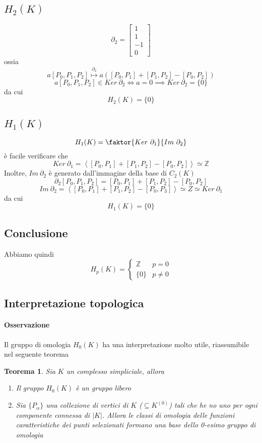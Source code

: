 \documentclass[a4paper]{report}
\newtheorem{theorem}{Teorema}
\newcommand{\Z}{\ensuremath{\mathbb{Z}}}
\newcommand{\gen}[1]{\ensuremath{\left<{#1}\right>}}
\newcommand{\pskel}[2]{\ensuremath{{#1}^{({#2})}}}
\begin{document}
\subsection{$H_2(K)$}
\[
    \partial_2=\begin{bmatrix}
        1 \\1\\-1\\0
    \end{bmatrix}
\]
ossia
\[
    a[P_0,P_1,P_2]\overset{\partial_2}{\longmapsto}a([P_0,P_1]+[P_1,P_2]-[P_0,P_2])
\]
\[
    a[P_0,P_1,P_2]\in Ker\ \partial_2\Longleftrightarrow a=0\implies Ker\ \partial_2=\{0\}
\]
da cui
\[
    H_2(K)=\{0\}
\]
\subsection{$H_1(K)$}
\[
    H_1(K)=\faktor{Ker\ \partial_1}{Im\ \partial_2}
\]
è facile verificare che
\[
    Ker\ \partial_1=\gen{[P_0,P_1]+[P_1,P_2]-[P_0,P_2]}\simeq\Z
\]
Inoltre, $Im\ \partial_2$ è generato dall'immagine della base di $C_2(K)$
\[
    \partial_2[P_0,P_1,P_2]=[P_0,P_1]+[P_1,P_2]-[P_0,P_2]
\]
\[
    Im\ \partial_2=\gen{[P_0,P_1]+[P_1,P_2]-[P_0,P_3]}\simeq Z\simeq Ker\ \partial_1
\]
da cui
\[
    H_1(K)=\{0\}
\]
\subsection{Conclusione}
Abbiamo quindi
\[
    H_p(K)=\left\{
    \begin{array}{ll}
        \Z    & p=0     \\
        \{0\} & p\neq 0
    \end{array}
    \right.
\]
\subsection{Interpretazione topologica}
\paragraph{Osservazione} Il gruppo di omologia $H_0(K)$ ha una interpretazione molto utile, riassumibile nel seguente teorema
\begin{theorem}
    Sia $K$ un complesso simpliciale, allora
    \begin{enumerate}
        \item Il gruppo $H_0(K)$ è un gruppo libero
        \item Sia $\{P_\alpha\}$ una collezione di vertici di $K$ ($\subseteq\pskel{K}{0}$) tali che he no uno per ogni componente connessa di $|K|$. Allora le classi di omologia delle funzioni caratteristiche dei punti selezionati formano una base dello 0-esimo gruppo di omologia
    \end{enumerate}
\end{theorem}
\end{document}

